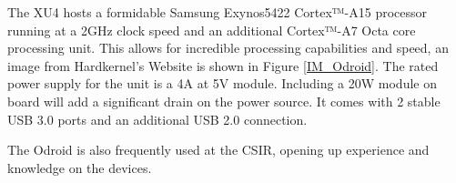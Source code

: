 				The XU4 hosts a formidable Samsung Exynos5422 Cortex™-A15 processor running at a 2GHz clock speed and an additional Cortex™-A7 Octa core processing unit. This allows for incredible processing capabilities and speed, an image from Hardkernel's Website is shown in Figure \ref{IM_Odroid}. The rated power supply for the unit is a 4A at 5V module. Including a 20W module on board will add a significant drain on the power source. It comes with 2 stable USB 3.0 ports and an additional USB 2.0 connection. 
				
				The Odroid is also frequently used at the CSIR, opening up experience and knowledge on the devices.
		
%			
%			
%			
		
